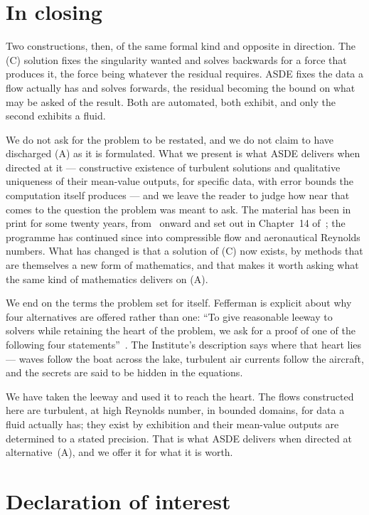 \documentclass[11pt]{article}
\begin{document}
\section{In closing}

Two constructions, then, of the same formal kind and opposite in direction. The (C) solution fixes
the singularity wanted and solves backwards for a force that produces it, the force being whatever
the residual requires. ASDE fixes the data a flow actually has and solves forwards, the residual
becoming the bound on what may be asked of the result. Both are automated, both exhibit, and only
the second exhibits a fluid.

We do not ask for the problem to be restated, and we do not claim to have discharged (A) as it is
formulated. What we present is what ASDE delivers when directed at it --- constructive existence of
turbulent solutions and qualitative uniqueness of their mean-value outputs, for specific data, with
error bounds the computation itself produces --- and we leave the reader to judge how near that comes
to the question the problem was meant to ask. The material has been in print
for some twenty years, from~\cite{newapproach} onward and set out in Chapter~14 of~\cite{cfd}; the
programme has continued since into compressible flow and aeronautical Reynolds numbers. What has changed is that a solution of (C) now exists, by methods
that are themselves a new form of mathematics, and that makes it worth asking what the same kind of
mathematics delivers on (A).

We end on the terms the problem set for itself. Fefferman is explicit about why four alternatives are
offered rather than one: ``To give reasonable leeway to solvers while retaining the heart of the
problem, we ask for a proof of one of the following four statements''~\cite{fefferman}. The
Institute's description says where that heart lies --- waves follow the boat across the lake,
turbulent air currents follow the aircraft, and the secrets are said to be hidden in the equations.

We have taken the leeway and used it to reach the heart. The flows constructed here are turbulent, at
high Reynolds number, in bounded domains, for data a fluid actually has; they exist by exhibition and
their mean-value outputs are determined to a stated precision. That is what ASDE delivers when
directed at alternative~(A), and we offer it for what it is worth.

\section*{Declaration of interest}
\end{document}
